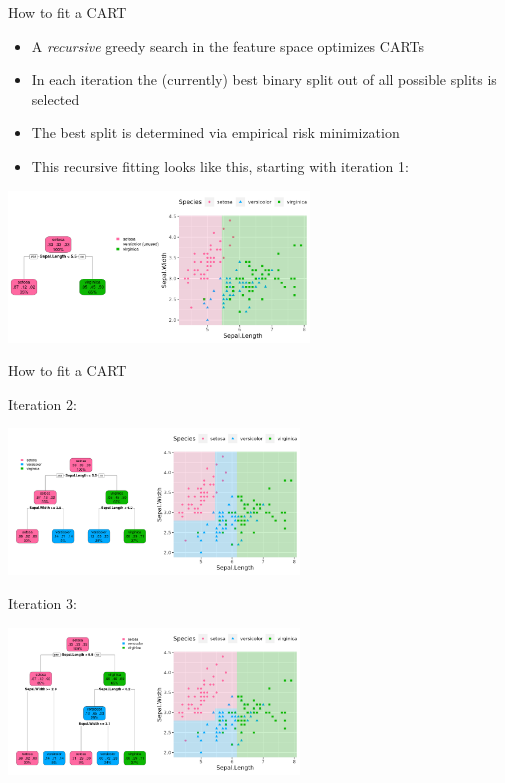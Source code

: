 \documentclass[11pt,compress,t,notes=noshow, xcolor=table]{beamer}
\begin{document}
\begin{vbframe}{How to fit a CART}

\begin{itemize} 
\item A \emph{recursive} greedy search in the feature space optimizes CARTs
\item In each iteration the (currently) best binary split out of all possible splits is selected
\item The best split is determined via empirical risk minimization
\item This recursive fitting looks like this, starting with iteration 1:

\end{itemize}

{\centering \includegraphics[width=0.6\textwidth]{figure/tree-classif-depth1.pdf} 

}

\end{vbframe}

\begin{vbframe}{How to fit a CART}

Iteration 2:

{\centering \includegraphics[width=0.58\textwidth]{figure/tree-classif-depth2.pdf} 

}

Iteration 3:

{\centering \includegraphics[width=0.58\textwidth]{figure/tree-classif-depth3.pdf} 

}

\end{vbframe} 
\end{document}
